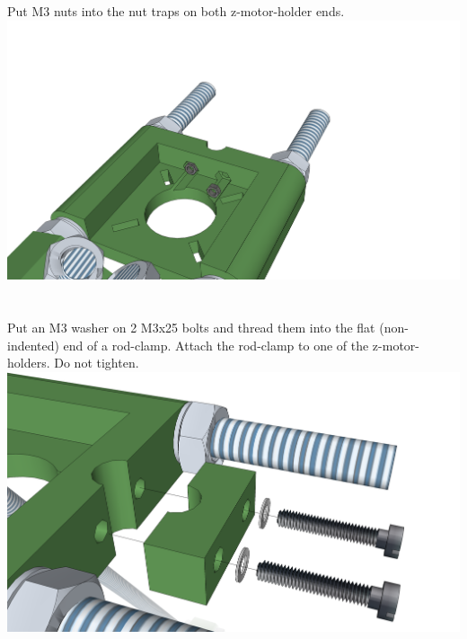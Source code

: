 \documentclass[twoside,a4paper,titlepage]{memoir}
\begin{document}
	\section{}
	Put M3 nuts into the nut traps on both z-motor-holder ends.\\
	\includegraphics[width=1\linewidth]{graphics/ch8_3.png}
	
	\section{}
	Put an M3 washer on 2 M3x25 bolts and thread them into the flat (non-indented) end of a rod-clamp.
	Attach the rod-clamp to one of the z-motor-holders. Do not tighten.\\
	\includegraphics[width=1\linewidth]{graphics/ch8_4.png}
	
\end{document}
